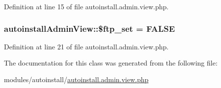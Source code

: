 Definition at line 15 of file autoinstall.\-admin.\-view.\-php.

\hypertarget{classautoinstallAdminView_a2b4389cba13f2fc27c57adb8b597a56f}{
\subsubsection[{\$ftp\-\_\-set}]{\setlength{\rightskip}{0pt plus 5cm}autoinstall\-Admin\-View\-::\$ftp\-\_\-set = F\-A\-L\-S\-E}}\label{classautoinstallAdminView_a2b4389cba13f2fc27c57adb8b597a56f}


Definition at line 21 of file autoinstall.\-admin.\-view.\-php.



The documentation for this class was generated from the following file\-:\begin{DoxyCompactItemize}
\item 
modules/autoinstall/\hyperlink{autoinstall_8admin_8view_8php}{autoinstall.\-admin.\-view.\-php}\end{DoxyCompactItemize}
